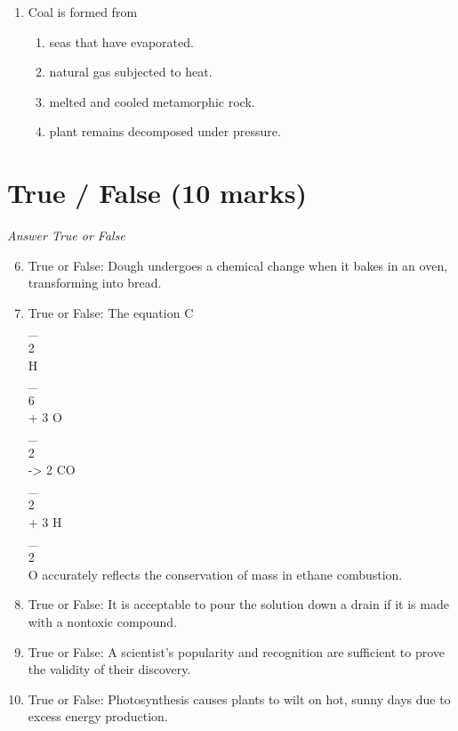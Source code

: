 \documentclass[12pt]{article}
\begin{document}
\begin{enumerate}[label=\arabic*.]
\begin{enumerate}[label=(\alph*)]
    \item having a litter of four babies
\end{enumerate}
\item Coal is formed from
\begin{enumerate}[label=(\alph*)]
    \item seas that have evaporated.
    \item natural gas subjected to heat.
    \item melted and cooled metamorphic rock.
    \item plant remains decomposed under pressure.
\end{enumerate}
\end{enumerate}

\section*{True / False (10 marks)}
\textit{Answer True or False}
\begin{enumerate}[label=\arabic*.]
\setcounter{enumi}{5}
\item True or False: Dough undergoes a chemical change when it bakes in an oven, transforming into bread.
\item True or False: The equation C\\_\\{2\\}H\\_\\{6\\} + 3 O\\_\\{2\\} -\textgreater{} 2 CO\\_\\{2\\} + 3 H\\_\\{2\\}O accurately reflects the conservation of mass in ethane combustion.
\item True or False: It is acceptable to pour the solution down a drain if it is made with a nontoxic compound.
\item True or False: A scientist's popularity and recognition are sufficient to prove the validity of their discovery.
\item True or False: Photosynthesis causes plants to wilt on hot, sunny days due to excess energy production.
\end{enumerate}
\end{document}
